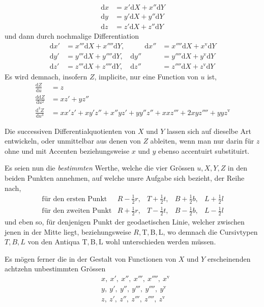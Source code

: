 %
\[
\begin{aligned}
\mathrm{d}x&=x'\mathrm{d}X+x''\mathrm{d}Y\\
\mathrm{d}y&=y'\mathrm{d}X+y''\mathrm{d}Y\\
\mathrm{d}z&=z'\mathrm{d}X+z''\mathrm{d}Y
\end{aligned}
\]
und dann durch nochmalige Differentiation
\[
\begin{aligned}
\mathrm{d}x'&=x'''\mathrm{d}X+x''''\mathrm{d}Y,&\qquad \mathrm{d}x''&=x''''\mathrm{d}X+x^{\mathrm{v}}\mathrm{d}Y\\
\mathrm{d}y'&=y'''\mathrm{d}X+y''''\mathrm{d}Y,&\mathrm{d}y''&=y''''\mathrm{d}X+y^{\mathrm{v}}\mathrm{d}Y\\
\mathrm{d}z'&=z'''\mathrm{d}X+z''''\mathrm{d}Y,&\mathrm{d}z''&=z''''\mathrm{d}X+z^{\mathrm{v}}\mathrm{d}Y
\end{aligned}
\]
Es wird demnach, insofern \(Z\), implicite, nur eine Function von \(u\) ist,
\[
\begin{aligned}
\frac{\mathrm{d}Z}{\mathrm{d}u}&=z\\
\frac{\mathrm{dd}Z}{\mathrm{d}u^2}&=xz'+yz''\\
\frac{\mathrm{d}^3Z}{\mathrm{d}u^3}&=xx'z'+xy'z''+x''yz'+yy''z''+xxz'''+2xyz''''+yyz^{\mathrm{v}}
\end{aligned}
\]

\indent Die successiven Differentialquotienten von \(X\) und \(Y\) lassen sich auf dieselbe Art entwickeln, oder unmittelbar aus denen von \(Z\) ableiten, wenn man nur darin für \(z\) ohne und mit Accenten beziehungsweise \(x\) und \(y\) ebenso accentuirt substituirt.

Es seien nun die \textit{bestimmten} Werthe, welche die vier Grössen \(u,X,Y,Z\) in den beiden Punkten annehmen, auf welche unsre Aufgabe sich bezieht, der Reihe nach,
\[
\begin{array}{lllll}
\text{für den ersten Punkt}&R-\tfrac12r,&T+\tfrac12t,&B+\tfrac12b,&L+\tfrac12l\\
\text{für den zweiten Punkt}&R+\tfrac12r,&T-\tfrac12t,&B-\tfrac12b,&L-\tfrac12l
\end{array}
\]
und eben so, für denjenigen Punkt der geodaetischen Linie, welcher zwischen jenen in der Mitte liegt, beziehungsweise \(R,\mathrm{T},\mathrm{B},\mathrm{L}\), wo demnach die Cursivtypen \(T,B,L\) von den Antiqua \(\mathrm{T},\mathrm{B},\mathrm{L}\) wohl unterschieden werden müssen.

Es mögen ferner die in der Gestalt von Functionen von \(X\) und \(Y\) erscheinenden achtzehn unbestimmten Grössen
\[
\begin{aligned}
&x,\ x',\ x'',\ x''',\ x'''',\ x^{\mathrm{v}}\\
&y,\ y',\ y'',\ y''',\ y'''',\ y^{\mathrm{v}}\\
&z,\ z',\ z'',\ z''',\ z'''',\ z^{\mathrm{v}}
\end{aligned}
\]
